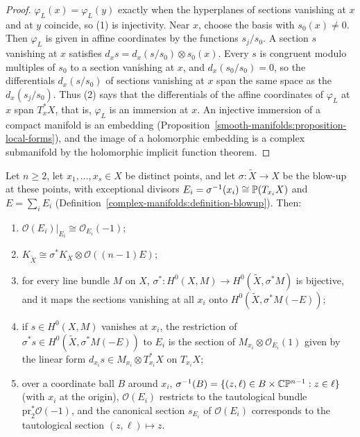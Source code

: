 \begin{proof}
$\varphi_L(x) = \varphi_L(y)$ exactly when the hyperplanes of sections vanishing at $x$ and at $y$ coincide, so (1) is injectivity. Near $x$, choose
the basis with $s_0(x) \neq 0$. Then $\varphi_L$ is given in affine coordinates by the functions $s_j/s_0$. A section $s$ vanishing at $x$ satisfies
$d_xs = d_x(s/s_0) \otimes s_0(x)$. Every $s$ is congruent modulo multiples of $s_0$ to a section vanishing at $x$, and $d_x(s_0/s_0) = 0$, so the
differentials $d_x(s/s_0)$ of sections vanishing at $x$ span the same space as the $d_x(s_j/s_0)$. Thus (2) says that the differentials of the
affine coordinates of $\varphi_L$ at $x$ span $T^*_xX$, that is, $\varphi_L$ is an immersion at $x$. An
injective immersion of a compact manifold is an embedding (Proposition~\ref{smooth-manifolds:proposition-local-forms}), and the image of a
holomorphic embedding is a complex submanifold by the holomorphic implicit function theorem.
\end{proof}

\begin{lemma}\label{kodaira:lemma-blowup-facts}
Let $n \geq 2$, let $x_1, \ldots, x_s \in X$ be distinct points, and let $\sigma \colon \tilde X \to X$ be the blow-up at these points, with
exceptional divisors $E_i = \sigma^{-1}(x_i) \cong \mathbb{P}(T_{x_i}X)$ and $E = \sum_iE_i$ (Definition~\ref{complex-manifolds:definition-blowup}). Then:
\begin{enumerate}
\item $\mathcal{O}(E_i)|_{E_i} \cong \mathcal{O}_{E_i}(-1)$;
\item $K_{\tilde X} \cong \sigma^*K_X \otimes \mathcal{O}((n-1)E)$;
\item for every line bundle $M$ on $X$, $\sigma^* \colon H^0(X, M) \to H^0(\tilde X, \sigma^*M)$ is bijective, and it maps the sections vanishing
at all $x_i$ onto $H^0(\tilde X, \sigma^*M(-E))$;
\item if $s \in H^0(X, M)$ vanishes at $x_i$, the restriction of $\sigma^*s \in H^0(\tilde X, \sigma^*M(-E))$ to $E_i$ is the section of
$M_{x_i} \otimes \mathcal{O}_{E_i}(1)$ given by the linear form $d_{x_i}s \in M_{x_i} \otimes T^*_{x_i}X$ on $T_{x_i}X$;
\item over a coordinate ball $B$ around $x_i$, $\sigma^{-1}(B) = \{(z, \ell) \in B \times \mathbb{C}\mathbb{P}^{n-1} : z \in \ell\}$ (with $x_i$ at the origin),
$\mathcal{O}(E_i)$ restricts to the tautological bundle $\mathrm{pr}_2^*\mathcal{O}(-1)$, and the canonical section $s_{E_i}$ of $\mathcal{O}(E_i)$
corresponds to the tautological section $(z, \ell) \mapsto z$.
\end{enumerate}
\end{lemma}

